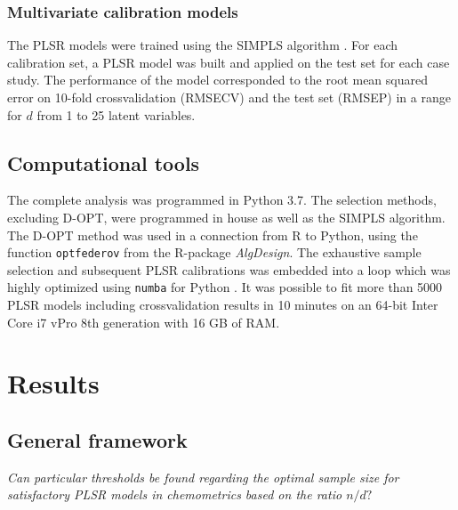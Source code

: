 \documentclass[journal=ancham,manuscript=article]{achemso}
\begin{document}
\subsubsection{Multivariate calibration models}

The PLSR models were trained using the SIMPLS algorithm \cite{DeJong1993}. For each calibration set, a PLSR model was built and applied on the test set for each case study. The performance of the model corresponded to the root mean squared error on 10-fold crossvalidation (RMSECV) and the test set (RMSEP) in a range for $d$ from 1 to 25 latent variables. 

\subsection{Computational tools}

The complete analysis was programmed in Python 3.7. The selection methods, excluding D-OPT, were programmed in house as well as the SIMPLS algorithm. The D-OPT method was used in a connection from R to Python, using the function \texttt{optfederov} from the R-package \emph{AlgDesign}\cite{Wheeler2019}. The exhaustive sample selection and subsequent PLSR calibrations was embedded into a loop which was highly optimized using \texttt{numba} for Python \cite{Lam2015}. It was possible to fit more than 5000 PLSR models including crossvalidation results in 10 minutes on an 64-bit Inter Core i7 vPro 8th generation with 16 GB of RAM. 



\section*{Results}\label{results}

\subsection*{General framework}\label{results:genframework}

\emph{Can particular thresholds be found regarding the optimal sample size for satisfactory PLSR models in chemometrics based on the ratio $n/d?$}
\end{document}
